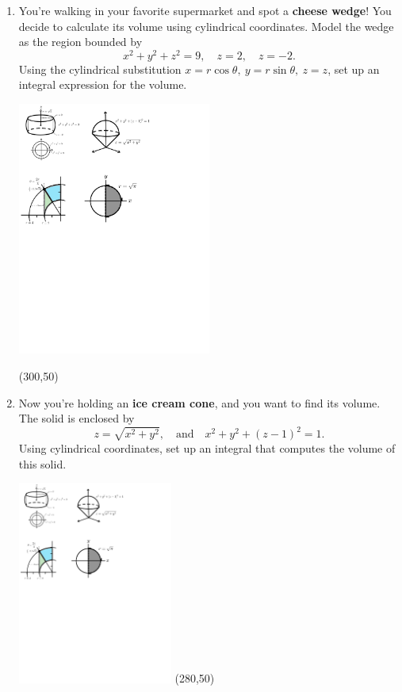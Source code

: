 \documentclass[12pt]{exam}
\begin{document}
\begin{enumerate}
\item You're walking in your favorite supermarket and spot a \textbf{cheese wedge}! You decide to calculate its volume using cylindrical coordinates.  
Model the wedge as the region bounded by
$$x^2+y^2+z^2=9, \quad z=2, \quad z=-2.$$
Using the cylindrical substitution $x=r\cos\theta,\ y=r\sin\theta,\ z=z$, set up an integral expression for the volume.
\begin{flushleft}
    \includegraphics[width=0.5\textwidth, trim=0.7cm 22cm 14.7cm 0.5cm,clip]{figs.pdf} 
\end{flushleft}
\begin{flushright}
\framebox(300,50){}
\end{flushright}

\item Now you're holding an \textbf{ice cream cone}, and you want to find its volume. The solid is enclosed by
$$z=\sqrt{x^2+y^2}, \quad \text{and} \quad x^2+y^2+(z-1)^2=1.$$
Using cylindrical coordinates, set up an integral that computes the volume of this solid.
\begin{flushleft}
    \includegraphics[width=0.4\textwidth, trim=8cm 22.8cm 6.8cm 0.7cm,clip]{figs.pdf}\hfill
\framebox(280,50){}
\end{flushleft}

\end{enumerate}
\end{document}
